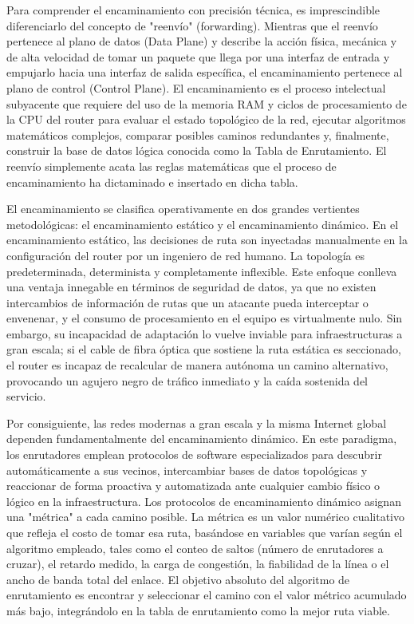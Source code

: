 \documentclass[a4paper,12pt]{article}
\begin{document}
Para comprender el encaminamiento con precisión técnica, es imprescindible diferenciarlo del concepto de "reenvío" (forwarding). Mientras que el reenvío pertenece al plano de datos (Data Plane) y describe la acción física, mecánica y de alta velocidad de tomar un paquete que llega por una interfaz de entrada y empujarlo hacia una interfaz de salida específica, el encaminamiento pertenece al plano de control (Control Plane). El encaminamiento es el proceso intelectual subyacente que requiere del uso de la memoria RAM y ciclos de procesamiento de la CPU del router para evaluar el estado topológico de la red, ejecutar algoritmos matemáticos complejos, comparar posibles caminos redundantes y, finalmente, construir la base de datos lógica conocida como la Tabla de Enrutamiento. El reenvío simplemente acata las reglas matemáticas que el proceso de encaminamiento ha dictaminado e insertado en dicha tabla.

El encaminamiento se clasifica operativamente en dos grandes vertientes metodológicas: el encaminamiento estático y el encaminamiento dinámico. En el encaminamiento estático, las decisiones de ruta son inyectadas manualmente en la configuración del router por un ingeniero de red humano. La topología es predeterminada, determinista y completamente inflexible. Este enfoque conlleva una ventaja innegable en términos de seguridad de datos, ya que no existen intercambios de información de rutas que un atacante pueda interceptar o envenenar, y el consumo de procesamiento en el equipo es virtualmente nulo. Sin embargo, su incapacidad de adaptación lo vuelve inviable para infraestructuras a gran escala; si el cable de fibra óptica que sostiene la ruta estática es seccionado, el router es incapaz de recalcular de manera autónoma un camino alternativo, provocando un agujero negro de tráfico inmediato y la caída sostenida del servicio.

Por consiguiente, las redes modernas a gran escala y la misma Internet global dependen fundamentalmente del encaminamiento dinámico. En este paradigma, los enrutadores emplean protocolos de software especializados para descubrir automáticamente a sus vecinos, intercambiar bases de datos topológicas y reaccionar de forma proactiva y automatizada ante cualquier cambio físico o lógico en la infraestructura. Los protocolos de encaminamiento dinámico asignan una "métrica" a cada camino posible. La métrica es un valor numérico cualitativo que refleja el costo de tomar esa ruta, basándose en variables que varían según el algoritmo empleado, tales como el conteo de saltos (número de enrutadores a cruzar), el retardo medido, la carga de congestión, la fiabilidad de la línea o el ancho de banda total del enlace. El objetivo absoluto del algoritmo de enrutamiento es encontrar y seleccionar el camino con el valor métrico acumulado más bajo, integrándolo en la tabla de enrutamiento como la mejor ruta viable.
\end{document}
